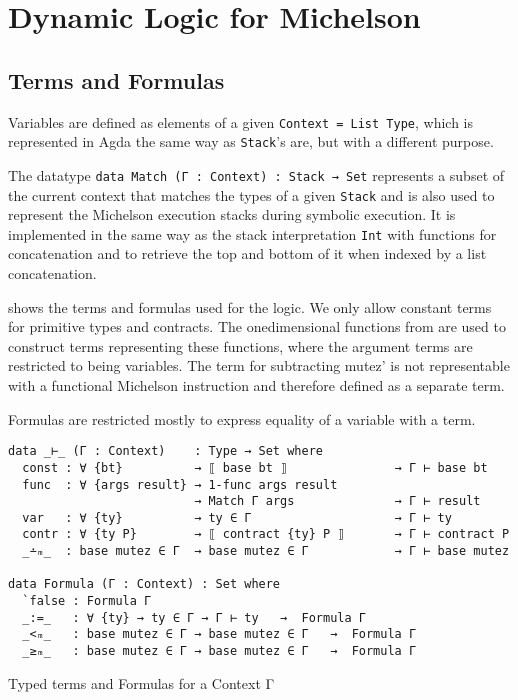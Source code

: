 \section{Dynamic Logic for Michelson}
\label{sec:DL}

\subsection{Terms and Formulas}\label{sec:terms-formulas}

Variables are defined as elements of a given \verb/Context = List Type/,
which is represented in Agda the same way as \verb/Stack/'s are, but with a different purpose.

The datatype \verb/data Match (Γ : Context) : Stack → Set/ represents a subset of the
current context that matches the types of a given \verb/Stack/ and is also used
to represent the Michelson execution stacks during symbolic execution.
It is implemented in the same way as the stack interpretation \verb/Int/ with functions
for concatenation and to retrieve the top and bottom of it when indexed by a list concatenation.

 shows the terms and formulas used for the logic.
We only allow constant terms for primitive types and contracts.
The onedimensional functions from  are used to construct
terms representing these functions, where the argument terms are restricted to being variables.
The term for subtracting mutez' is not representable with a functional Michelson instruction
and therefore defined as a separate term.

Formulas are restricted mostly to express equality of a variable with a term.

\begin{listing}[!ht]
\begin{verbatim}
data _⊢_ (Γ : Context)    : Type → Set where
  const : ∀ {bt}          → ⟦ base bt ⟧               → Γ ⊢ base bt
  func  : ∀ {args result} → 1-func args result
                          → Match Γ args              → Γ ⊢ result
  var   : ∀ {ty}          → ty ∈ Γ                    → Γ ⊢ ty
  contr : ∀ {ty P}        → ⟦ contract {ty} P ⟧       → Γ ⊢ contract P
  _∸ₘ_  : base mutez ∈ Γ  → base mutez ∈ Γ            → Γ ⊢ base mutez

data Formula (Γ : Context) : Set where
  `false : Formula Γ
  _:=_   : ∀ {ty} → ty ∈ Γ → Γ ⊢ ty   →  Formula Γ
  _<ₘ_   : base mutez ∈ Γ → base mutez ∈ Γ   →  Formula Γ
  _≥ₘ_   : base mutez ∈ Γ → base mutez ∈ Γ   →  Formula Γ
\end{verbatim}
\caption{Typed terms and Formulas for a Context Γ}
\label{terms-formulas}
\end{listing}


